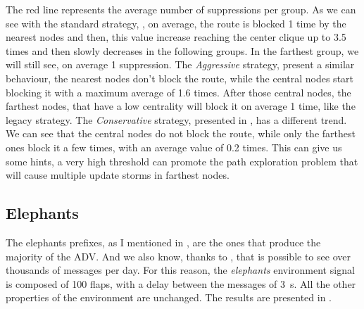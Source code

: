 The red line represents the average number of suppressions per group.
As we can see with the standard strategy, , 
on average, the route is blocked \num{1} time by the nearest nodes and then, 
this value increase reaching the center clique up to \num{3.5} times and then
slowly decreases in the following groups.
In the farthest group, we will still see, on average \num{1} suppression.
The \textit{Aggressive} strategy,  present
a similar behaviour, the nearest nodes don't block the route, while the central
nodes start blocking it with a maximum average of \num{1.6} times.
After those central nodes, the farthest nodes, that have a low centrality will
block it on average \num{1} time, like the legacy strategy.
The \textit{Conservative} strategy, presented in ,
has a different trend.
We can see that the central nodes do not block the route, while only the farthest
ones block it a few times, with an average value of \num{0.2} times.
This can give us some hints, a very high threshold can promote the path
exploration problem that will cause multiple update storms in farthest nodes.


\subsection{Elephants}
\label{subsec:bgp_elephants}

The elephants prefixes, as I mentioned in ,
are the ones that produce the majority of the \ac{ADV}.
And we also know, thanks to \cite{huston2006bgp}, that is possible to see over
thousands of messages per day.
For this reason, the \textit{elephants} environment signal is composed of \num{100}
flaps, with a delay between the messages of \SI{3}{\second}.
All the other properties of the environment are unchanged.
The results are presented in .

